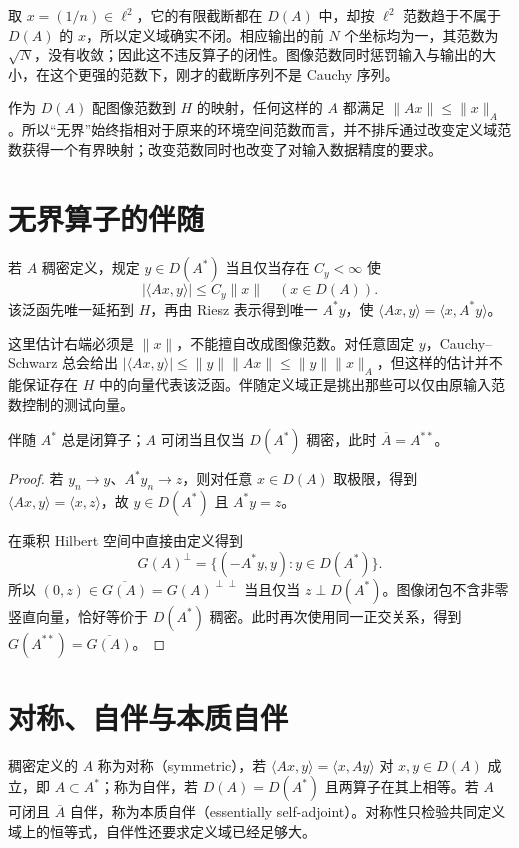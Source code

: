 \documentclass[UTF8,12pt,a4paper,fontset=fandol]{ctexbook}
\begin{document}
取 $x=(1/n)\in\ell^2$，它的有限截断都在 $D(A)$ 中，却按 $\ell^2$ 范数趋于不属于 $D(A)$ 的 $x$，所以定义域确实不闭。相应输出的前 $N$ 个坐标均为一，其范数为 $\sqrt N$，没有收敛；因此这不违反算子的闭性。图像范数同时惩罚输入与输出的大小，在这个更强的范数下，刚才的截断序列不是 Cauchy 序列。

作为 $D(A)$ 配图像范数到 $H$ 的映射，任何这样的 $A$ 都满足 $\|Ax\|\leq\|x\|_A$。所以“无界”始终指相对于原来的环境空间范数而言，并不排斥通过改变定义域范数获得一个有界映射；改变范数同时也改变了对输入数据精度的要求。

\section{无界算子的伴随}
若 $A$ 稠密定义，规定 $y\in D(A^*)$ 当且仅当存在 $C_y<\infty$ 使
\[
 |\langle Ax,y\rangle|\leq C_y\|x\|\quad(x\in D(A)).
\]
该泛函先唯一延拓到 $H$，再由 Riesz 表示得到唯一 $A^*y$，使 $\langle Ax,y\rangle=\langle x,A^*y\rangle$。

这里估计右端必须是 $\|x\|$，不能擅自改成图像范数。对任意固定 $y$，Cauchy--Schwarz 总会给出 $|\langle Ax,y\rangle|\leq\|y\|\|Ax\|\leq\|y\|\|x\|_A$，但这样的估计并不能保证存在 $H$ 中的向量代表该泛函。伴随定义域正是挑出那些可以仅由原输入范数控制的测试向量。

\begin{proposition}
伴随 $A^*$ 总是闭算子；$A$ 可闭当且仅当 $D(A^*)$ 稠密，此时 $\overline A=A^{**}$。
\end{proposition}
\begin{proof}
若 $y_n\to y$、$A^*y_n\to z$，则对任意 $x\in D(A)$ 取极限，得到 $\langle Ax,y\rangle=\langle x,z\rangle$，故 $y\in D(A^*)$ 且 $A^*y=z$。

在乘积 Hilbert 空间中直接由定义得到
\[
 G(A)^\perp=\{(-A^*y,y):y\in D(A^*)\}.
\]
所以 $(0,z)\in\overline{G(A)}=G(A)^{\perp\perp}$ 当且仅当 $z\perp D(A^*)$。图像闭包不含非零竖直向量，恰好等价于 $D(A^*)$ 稠密。此时再次使用同一正交关系，得到 $G(A^{**})=\overline{G(A)}$。
\end{proof}

\section{对称、自伴与本质自伴}
稠密定义的 $A$ 称为对称（symmetric），若 $\langle Ax,y\rangle=\langle x,Ay\rangle$ 对 $x,y\in D(A)$ 成立，即 $A\subset A^*$；称为自伴，若 $D(A)=D(A^*)$ 且两算子在其上相等。若 $A$ 可闭且 $\overline A$ 自伴，称为本质自伴（essentially self-adjoint）。对称性只检验共同定义域上的恒等式，自伴性还要求定义域已经足够大。
\end{document}
